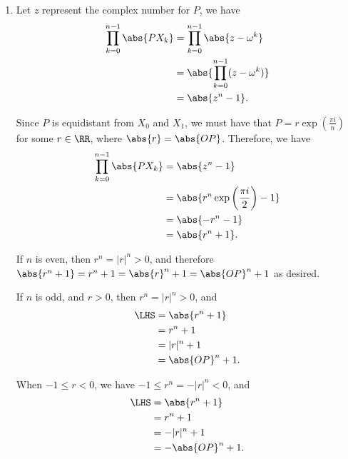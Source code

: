 \begin{enumerate}
    \item Let \(z\) represent the complex number for \(P\), we have
          \begin{align*}
              \prod_{k = 0}^{n - 1} \abs{P X_k} & = \prod_{k = 0}^{n - 1} \abs{z - \omega^k}   \\
                                                & = \abs{\prod_{k = 0}^{n - 1} (z - \omega^k)} \\
                                                & = \abs{z^n - 1}.
          \end{align*}

          Since \(P\) is equidistant from \(X_0\) and \(X_1\), we must have that \(P = r \exp\left(\frac{\pi i}{n}\right)\) for some \(r \in \RR\), where \(\abs{r} = \abs{OP}\). Therefore, we have
          \begin{align*}
              \prod_{k = 0}^{n - 1} \abs{P X_k} & = \abs{z^n - 1}                                  \\
                                                & = \abs{r^n \exp\left(\frac{\pi i}{2}\right) - 1} \\
                                                & = \abs{-r^n - 1}                                 \\
                                                & = \abs{r^n + 1}.
          \end{align*}

          If \(n\) is even, then \(r^n = |r|^n > 0\), and therefore \(\abs{r^n + 1} = r^n + 1 = \abs{r}^n + 1 = \abs{OP}^n + 1\) as desired.

          If \(n\) is odd, and \(r > 0\), then \(r^n = |r|^n > 0\), and
          \begin{align*}
              \LHS & = \abs{r^n + 1}   \\
                   & = r^n + 1         \\
                   & = |r|^n + 1       \\
                   & = \abs{OP}^n + 1.
          \end{align*}

          When \(-1 \leq r < 0\), we have \(-1 \leq r^n = -|r|^n < 0\), and
          \begin{align*}
              \LHS & = \abs{r^n + 1}    \\
                   & = r^n + 1          \\
                   & = -|r|^n + 1       \\
                   & = -\abs{OP}^n + 1.
          \end{align*}


\end{enumerate}
